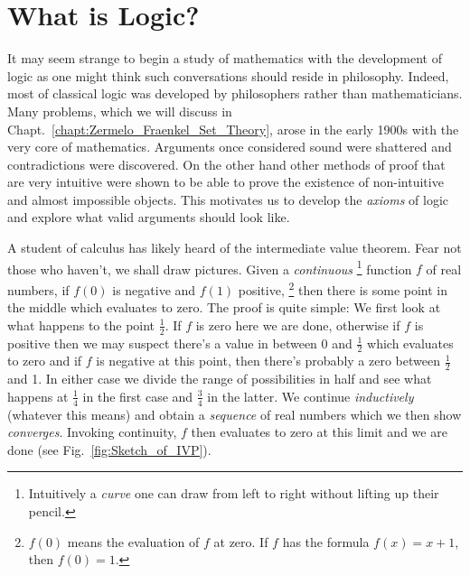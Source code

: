\section{What is Logic?}
    It may seem strange to begin a study of mathematics with the development of
    logic as one might think such conversations should reside in philosophy.
    Indeed, most of classical logic was developed by philosophers rather than
    mathematicians. Many problems, which we will discuss in
    Chapt.~\ref{chapt:Zermelo_Fraenkel_Set_Theory}, arose in the early 1900s
    with the very core of mathematics. Arguments once considered sound were
    shattered and contradictions were discovered. On the other hand
    other methods of proof that are very intuitive were shown to be able to
    prove the existence of non-intuitive and almost impossible objects. This
    motivates us to develop the \textit{axioms} of logic and explore what valid
    arguments should look like.
    \begin{example}
        \label{ex:Logic_IVP}%
        A student of calculus has likely heard of the intermediate value
        theorem. Fear not those who haven't,
        we shall draw pictures. Given a \textit{continuous}%
        \footnote{%
            Intuitively a \textit{curve} one can draw from left to right without
            lifting up their pencil.%
        }
        function $f$ of real numbers, if $f(0)$ is negative and $f(1)$
        positive,%
        \footnote{%
            $f(0)$ means the evaluation of $f$ at zero. If $f$ has the formula
            $f(x)=x+1$, then $f(0)=1$.
        }
        then there is some point in the middle which evaluates to zero. The
        proof is quite simple: We first look at what happens to the point
        $\frac{1}{2}$. If $f$ is zero here we are done, otherwise if $f$ is
        positive then we may suspect there's a value in
        between 0 and $\frac{1}{2}$ which evaluates to zero and if $f$ is
        negative at this point, then there's probably a zero between
        $\frac{1}{2}$ and 1. In either case we divide the range of possibilities
        in half and see what happens at $\frac{1}{4}$ in the first case and
        $\frac{3}{4}$ in the latter. We continue \textit{inductively} (whatever
        this means) and obtain a \textit{sequence} of real numbers which we then
        show \textit{converges}. Invoking continuity, $f$ then evaluates to
        zero at this limit and we are done (see Fig.~\ref{fig:Sketch_of_IVP}).
    \end{example}
